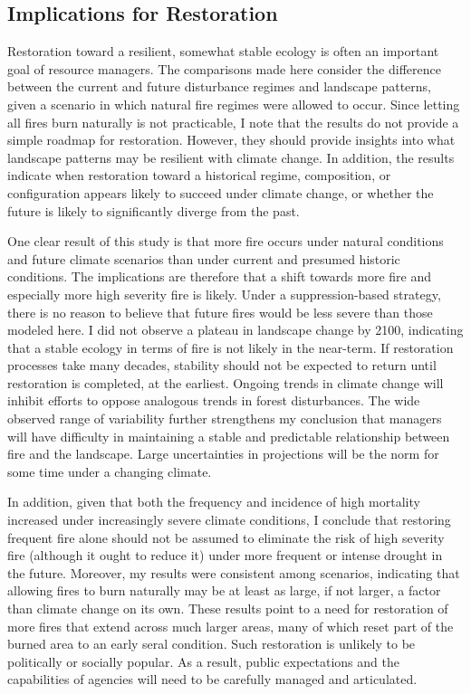 \subsection{Implications for Restoration}

Restoration toward a resilient, somewhat stable ecology is often an important goal of resource managers. The comparisons made here consider the difference between the current and future disturbance regimes and landscape patterns, given a scenario in which natural fire regimes were allowed to occur. Since letting all fires burn naturally is not practicable, I note that the results do not provide a simple roadmap for restoration. However, they should provide insights into what landscape patterns may be resilient with climate change. In addition, the results indicate when restoration toward a historical regime, composition, or configuration appears likely to succeed under climate change, or whether the future is likely to significantly diverge from the past. 

One clear result of this study is that more fire occurs under natural conditions and future climate scenarios than under current and presumed historic conditions. The implications are therefore that a shift towards more fire and especially more high severity fire is likely. Under a suppression-based strategy, there is no reason to believe that future fires would be less severe than those modeled here. I did not observe a plateau in landscape change by 2100, indicating that a stable ecology in terms of fire is not likely in the near-term. If restoration processes take many decades, stability should not be expected to return until restoration is completed, at the earliest. Ongoing trends in climate change will inhibit efforts to oppose analogous trends in forest disturbances. The wide observed range of variability further strengthens my conclusion that managers will have difficulty in maintaining a stable and predictable relationship between fire and the landscape. Large uncertainties in projections will be the norm for some time under a changing climate. 

In addition, given that both the frequency and incidence of high mortality increased under increasingly severe climate conditions, I conclude that restoring frequent fire alone should not be assumed to eliminate the risk of high severity fire (although it ought to reduce it) under more frequent or intense drought in the future. Moreover, my results were consistent among scenarios, indicating that allowing fires to burn naturally may be at least as large, if not larger, a factor than climate change on its own. These results point to a need for restoration of more fires that extend across much larger areas, many of which reset part of the burned area to an early seral condition. Such restoration is unlikely to be politically or socially popular. As a result, public expectations and the capabilities of agencies will need to be carefully managed and articulated. 

